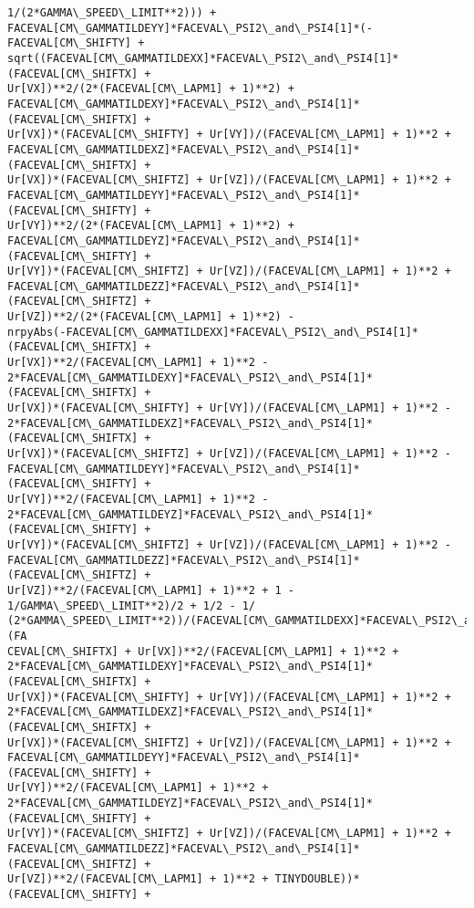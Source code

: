 \documentclass[landscape,letterpaper,10pt,english]{article}
\begin{document}
\begin{Verbatim}[commandchars=\\\{\}]
1/(2*GAMMA\_SPEED\_LIMIT**2))) +
FACEVAL[CM\_GAMMATILDEYY]*FACEVAL\_PSI2\_and\_PSI4[1]*(-FACEVAL[CM\_SHIFTY] +
sqrt((FACEVAL[CM\_GAMMATILDEXX]*FACEVAL\_PSI2\_and\_PSI4[1]*(FACEVAL[CM\_SHIFTX] +
Ur[VX])**2/(2*(FACEVAL[CM\_LAPM1] + 1)**2) +
FACEVAL[CM\_GAMMATILDEXY]*FACEVAL\_PSI2\_and\_PSI4[1]*(FACEVAL[CM\_SHIFTX] +
Ur[VX])*(FACEVAL[CM\_SHIFTY] + Ur[VY])/(FACEVAL[CM\_LAPM1] + 1)**2 +
FACEVAL[CM\_GAMMATILDEXZ]*FACEVAL\_PSI2\_and\_PSI4[1]*(FACEVAL[CM\_SHIFTX] +
Ur[VX])*(FACEVAL[CM\_SHIFTZ] + Ur[VZ])/(FACEVAL[CM\_LAPM1] + 1)**2 +
FACEVAL[CM\_GAMMATILDEYY]*FACEVAL\_PSI2\_and\_PSI4[1]*(FACEVAL[CM\_SHIFTY] +
Ur[VY])**2/(2*(FACEVAL[CM\_LAPM1] + 1)**2) +
FACEVAL[CM\_GAMMATILDEYZ]*FACEVAL\_PSI2\_and\_PSI4[1]*(FACEVAL[CM\_SHIFTY] +
Ur[VY])*(FACEVAL[CM\_SHIFTZ] + Ur[VZ])/(FACEVAL[CM\_LAPM1] + 1)**2 +
FACEVAL[CM\_GAMMATILDEZZ]*FACEVAL\_PSI2\_and\_PSI4[1]*(FACEVAL[CM\_SHIFTZ] +
Ur[VZ])**2/(2*(FACEVAL[CM\_LAPM1] + 1)**2) -
nrpyAbs(-FACEVAL[CM\_GAMMATILDEXX]*FACEVAL\_PSI2\_and\_PSI4[1]*(FACEVAL[CM\_SHIFTX] +
Ur[VX])**2/(FACEVAL[CM\_LAPM1] + 1)**2 -
2*FACEVAL[CM\_GAMMATILDEXY]*FACEVAL\_PSI2\_and\_PSI4[1]*(FACEVAL[CM\_SHIFTX] +
Ur[VX])*(FACEVAL[CM\_SHIFTY] + Ur[VY])/(FACEVAL[CM\_LAPM1] + 1)**2 -
2*FACEVAL[CM\_GAMMATILDEXZ]*FACEVAL\_PSI2\_and\_PSI4[1]*(FACEVAL[CM\_SHIFTX] +
Ur[VX])*(FACEVAL[CM\_SHIFTZ] + Ur[VZ])/(FACEVAL[CM\_LAPM1] + 1)**2 -
FACEVAL[CM\_GAMMATILDEYY]*FACEVAL\_PSI2\_and\_PSI4[1]*(FACEVAL[CM\_SHIFTY] +
Ur[VY])**2/(FACEVAL[CM\_LAPM1] + 1)**2 -
2*FACEVAL[CM\_GAMMATILDEYZ]*FACEVAL\_PSI2\_and\_PSI4[1]*(FACEVAL[CM\_SHIFTY] +
Ur[VY])*(FACEVAL[CM\_SHIFTZ] + Ur[VZ])/(FACEVAL[CM\_LAPM1] + 1)**2 -
FACEVAL[CM\_GAMMATILDEZZ]*FACEVAL\_PSI2\_and\_PSI4[1]*(FACEVAL[CM\_SHIFTZ] +
Ur[VZ])**2/(FACEVAL[CM\_LAPM1] + 1)**2 + 1 - 1/GAMMA\_SPEED\_LIMIT**2)/2 + 1/2 - 1/
(2*GAMMA\_SPEED\_LIMIT**2))/(FACEVAL[CM\_GAMMATILDEXX]*FACEVAL\_PSI2\_and\_PSI4[1]*(FA
CEVAL[CM\_SHIFTX] + Ur[VX])**2/(FACEVAL[CM\_LAPM1] + 1)**2 +
2*FACEVAL[CM\_GAMMATILDEXY]*FACEVAL\_PSI2\_and\_PSI4[1]*(FACEVAL[CM\_SHIFTX] +
Ur[VX])*(FACEVAL[CM\_SHIFTY] + Ur[VY])/(FACEVAL[CM\_LAPM1] + 1)**2 +
2*FACEVAL[CM\_GAMMATILDEXZ]*FACEVAL\_PSI2\_and\_PSI4[1]*(FACEVAL[CM\_SHIFTX] +
Ur[VX])*(FACEVAL[CM\_SHIFTZ] + Ur[VZ])/(FACEVAL[CM\_LAPM1] + 1)**2 +
FACEVAL[CM\_GAMMATILDEYY]*FACEVAL\_PSI2\_and\_PSI4[1]*(FACEVAL[CM\_SHIFTY] +
Ur[VY])**2/(FACEVAL[CM\_LAPM1] + 1)**2 +
2*FACEVAL[CM\_GAMMATILDEYZ]*FACEVAL\_PSI2\_and\_PSI4[1]*(FACEVAL[CM\_SHIFTY] +
Ur[VY])*(FACEVAL[CM\_SHIFTZ] + Ur[VZ])/(FACEVAL[CM\_LAPM1] + 1)**2 +
FACEVAL[CM\_GAMMATILDEZZ]*FACEVAL\_PSI2\_and\_PSI4[1]*(FACEVAL[CM\_SHIFTZ] +
Ur[VZ])**2/(FACEVAL[CM\_LAPM1] + 1)**2 + TINYDOUBLE))*(FACEVAL[CM\_SHIFTY] +

\end{Verbatim}
\end{document}
